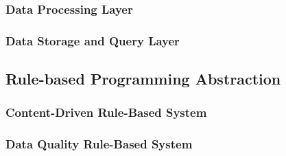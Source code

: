 \subsubsection{Data Processing Layer}

\subsubsection{Data Storage and Query Layer}

\subsection{Rule-based Programming Abstraction}\label{sec:programming-data}

\subsubsection{Content-Driven Rule-Based System}

\subsubsection{Data Quality Rule-Based System}

